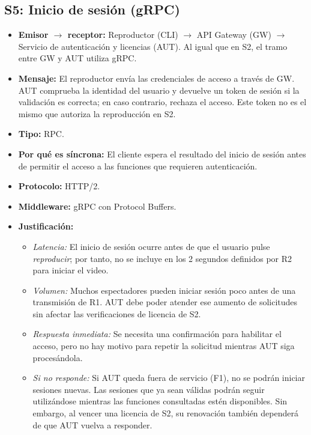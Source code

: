 \subsection{S5: Inicio de sesión (gRPC)}
\label{sub:s5}

\begin{itemize}
    \item \textbf{Emisor $\rightarrow$ receptor:}
    Reproductor (CLI) $\rightarrow$ API Gateway (GW) $\rightarrow$ Servicio de autenticación y licencias (AUT). Al igual que en S2, el tramo entre GW y AUT utiliza gRPC.

    \item \textbf{Mensaje:}
    El reproductor envía las credenciales de acceso a través de GW. AUT comprueba la identidad del usuario y devuelve un token de sesión si la validación es correcta; en caso contrario, rechaza el acceso. Este token no es el mismo que autoriza la reproducción en S2.

    \item \textbf{Tipo:} RPC.

    \item \textbf{Por qué es síncrona:}
    El cliente espera el resultado del inicio de sesión antes de permitir el acceso a las funciones que requieren autenticación.

    \item \textbf{Protocolo:} HTTP/2.

    \item \textbf{Middleware:} gRPC con Protocol Buffers.

    \item \textbf{Justificación:}
    \begin{itemize}
        \item \textit{Latencia:}
        El inicio de sesión ocurre antes de que el usuario pulse \emph{reproducir}; por tanto, no se incluye en los 2 segundos definidos por R2 para iniciar el video.

        \item \textit{Volumen:}
        Muchos espectadores pueden iniciar sesión poco antes de una transmisión de R1. AUT debe poder atender ese aumento de solicitudes sin afectar las verificaciones de licencia de S2.

        \item \textit{Respuesta inmediata:}
        Se necesita una confirmación para habilitar el acceso, pero no hay motivo para repetir la solicitud mientras AUT siga procesándola.

        \item \textit{Si no responde:}
        Si AUT queda fuera de servicio (F1), no se podrán iniciar sesiones nuevas. Las sesiones que ya sean válidas podrán seguir utilizándose mientras las funciones consultadas estén disponibles. Sin embargo, al vencer una licencia de S2, su renovación también dependerá de que AUT vuelva a responder.


\end{itemize}
\end{itemize}
